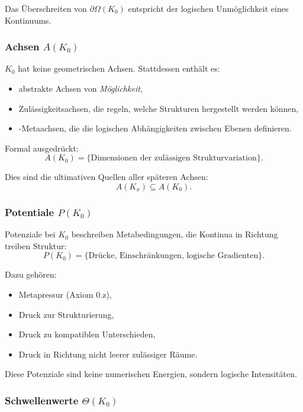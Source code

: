 Das Überschreiten von $\partial\Omega(K_0)$ entspricht der logischen Unmöglichkeit
eines Kontinuums.

\subsubsection{Achsen \texorpdfstring{$A(K_0)$}{A(K_0)}}

$K_0$ hat keine geometrischen Achsen. Stattdessen enthält es:
\begin{itemize}
    \item abstrakte Achsen von \emph{Möglichkeit},
    \item Zulässigkeitsachsen, die regeln, welche Strukturen hergestellt werden können,
    \item-Metaachsen, die die logischen Abhängigkeiten zwischen Ebenen definieren.
\end{itemize}

Formal ausgedrückt:
\[
A(K_0) = \{ \text{Dimensionen der zulässigen Strukturvariation} \}.
\]

Dies sind die ultimativen Quellen aller späteren Achsen:
\[
A(K_x) \subseteq A(K_0).
\]

\subsubsection{Potentiale \texorpdfstring{$P(K_0)$}{P(K_0)}}

Potenziale bei $K_0$ beschreiben Metabedingungen, die Kontinua in Richtung treiben
Struktur:
\[
P(K_0) = \{ \text{Drücke, Einschränkungen, logische Gradienten} \}.
\]

Dazu gehören:
\begin{itemize}
    \item Metapressur (Axiom 0.z),
    \item Druck zur Strukturierung,
    \item Druck zu kompatiblen Unterschieden,
    \item Druck in Richtung nicht leerer zulässiger Räume.
\end{itemize}

Diese Potenziale sind keine numerischen Energien, sondern logische Intensitäten.

\subsubsection{Schwellenwerte \texorpdfstring{$\Theta(K_0)$}{\Theta(K_0)}}


